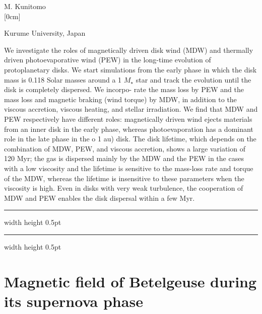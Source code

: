 \documentclass[a4paper,11pt]{book}
\def\doubleline{
\hrule width \hsize height 0.5pt  \kern 1mm \hrule width \hsize height 0.5pt 
}
\begin{document}
\begin{center}
{\large M. Kunitomo}\\



[0cm]



  
\vspace{2 mm}
\noindent Kurume University, Japan\\

\end{center}



  
\vspace{2 mm}
\noindent We investigate the roles of magnetically driven disk wind (MDW) and thermally driven photoevaporative wind (PEW) in the long-time evolution of protoplanetary disks. We start simulations from the early phase in which the disk mass is 0.118 Solar masses around a 1 $M_\star$ star and track the evolution until the disk is completely dispersed. We incorpo- rate the mass loss by PEW and the mass loss and magnetic braking (wind torque) by MDW, in addition to the viscous accretion, viscous heating, and stellar irradiation. We find that MDW and PEW respectively have different roles: magnetically driven wind ejects materials from an inner disk in the early phase, whereas photoevaporation has a dominant role in the late phase in the o 1 au) disk. The disk lifetime, which depends on the combination of MDW, PEW, and viscous accretion, shows a large variation of 120 Myr; the gas is dispersed mainly by the MDW and the PEW in the cases with a low viscosity and the lifetime is sensitive to the mass-loss rate and torque of the MDW, whereas the lifetime is insensitive to these parameters when the viscosity is high. Even in disks with very weak turbulence, the cooperation of MDW and PEW enables the disk dispersal within a few Myr.

\noindent\doubleline
        
          \section[Magnetic field of Betelgeuse during its supernova phase \newline(Pascal Petit)] { Magnetic field of Betelgeuse during its supernova phase }
\end{document}

